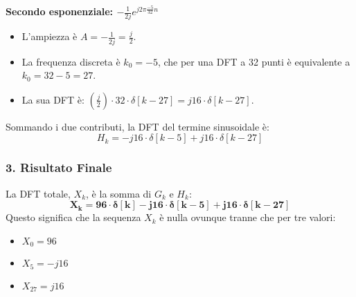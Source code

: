 \begin{soluzione}{13}
    \textbf{Secondo esponenziale: $-\frac{1}{2j} e^{j2\pi\frac{-5}{32}n}$}
    \begin{itemize}
        \item L'ampiezza è $A = -\frac{1}{2j} = \frac{j}{2}$.
        \item La frequenza discreta è $k_0 = -5$, che per una DFT a 32 punti è equivalente a $k_0 = 32 - 5 = 27$.
        \item La sua DFT è: $(\frac{j}{2}) \cdot 32 \cdot \delta[k - 27] = j16 \cdot \delta[k - 27]$.
    \end{itemize}
    
    Sommando i due contributi, la DFT del termine sinusoidale è:
    \[
        H_k = -j16 \cdot \delta[k - 5] + j16 \cdot \delta[k - 27]
    \]

    \subsubsection*{3. Risultato Finale}
    La DFT totale, $X_k$, è la somma di $G_k$ e $H_k$:
    \[
        \mathbf{X_k = 96 \cdot \delta[k] - j16 \cdot \delta[k - 5] + j16 \cdot \delta[k - 27]}
    \]
    Questo significa che la sequenza $X_k$ è nulla ovunque tranne che per tre valori:
    \begin{itemize}
        \item $X_0 = 96$
        \item $X_5 = -j16$
        \item $X_{27} = j16$
    \end{itemize}
    
\end{soluzione}